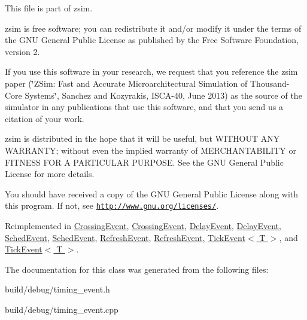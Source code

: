 This file is part of zsim.

zsim is free software; you can redistribute it and/or modify it under the terms of the G\-N\-U General Public License as published by the Free Software Foundation, version 2.

If you use this software in your research, we request that you reference the zsim paper (\char`\"{}\-Z\-Sim\-: Fast and Accurate Microarchitectural Simulation of
\-Thousand-\/\-Core Systems\char`\"{}, Sanchez and Kozyrakis, I\-S\-C\-A-\/40, June 2013) as the source of the simulator in any publications that use this software, and that you send us a citation of your work.

zsim is distributed in the hope that it will be useful, but W\-I\-T\-H\-O\-U\-T A\-N\-Y W\-A\-R\-R\-A\-N\-T\-Y; without even the implied warranty of M\-E\-R\-C\-H\-A\-N\-T\-A\-B\-I\-L\-I\-T\-Y or F\-I\-T\-N\-E\-S\-S F\-O\-R A P\-A\-R\-T\-I\-C\-U\-L\-A\-R P\-U\-R\-P\-O\-S\-E. See the G\-N\-U General Public License for more details.

You should have received a copy of the G\-N\-U General Public License along with this program. If not, see \href{http://www.gnu.org/licenses/}{\tt http\-://www.\-gnu.\-org/licenses/}. 

Reimplemented in \hyperlink{classCrossingEvent_a96199fafd70da779df838f73f24cb6b5}{Crossing\-Event}, \hyperlink{classCrossingEvent_a29ef173f72101241b0d966c651cc8877}{Crossing\-Event}, \hyperlink{classDelayEvent_aa1a9ef6d5dc0d8c74f6e2c52d217ef73}{Delay\-Event}, \hyperlink{classDelayEvent_aa1a9ef6d5dc0d8c74f6e2c52d217ef73}{Delay\-Event}, \hyperlink{classSchedEvent_aabd0b9e2eedd6a393aa9fbdb45d8fab4}{Sched\-Event}, \hyperlink{classSchedEvent_aabd0b9e2eedd6a393aa9fbdb45d8fab4}{Sched\-Event}, \hyperlink{classRefreshEvent_af9afce48ab90b3acbbe9c72bd5f7e552}{Refresh\-Event}, \hyperlink{classRefreshEvent_af9afce48ab90b3acbbe9c72bd5f7e552}{Refresh\-Event}, \hyperlink{classTickEvent_ab044a76691e38747e8a1a4106910fcab}{Tick\-Event$<$ T $>$}, and \hyperlink{classTickEvent_ab044a76691e38747e8a1a4106910fcab}{Tick\-Event$<$ T $>$}.



The documentation for this class was generated from the following files\-:\begin{DoxyCompactItemize}
\item 
build/debug/timing\-\_\-event.\-h\item 
build/debug/timing\-\_\-event.\-cpp\end{DoxyCompactItemize}
